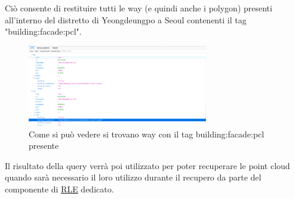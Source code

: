 Ciò consente di restituire tutti le way (e quindi anche i polygon) presenti all'interno del distretto di Yeongdeungpo a Seoul contenenti il tag "building:facade:pcl".

\begin{figure}[H]
    \centering
    \includegraphics[width=0.7\textwidth]{Immagini/RisultatoQuery.png}
    \caption{Come si può vedere si trovano way con il tag building:facade:pcl presente}
    \label{fig:QueryResult}
\end{figure}

Il risultato della query verrà poi utilizzato per poter recuperare le point cloud quando sarà necessario il loro utilizzo durante il recupero da parte del componente di \hyperref[sez:RLE]{RLE} dedicato.  